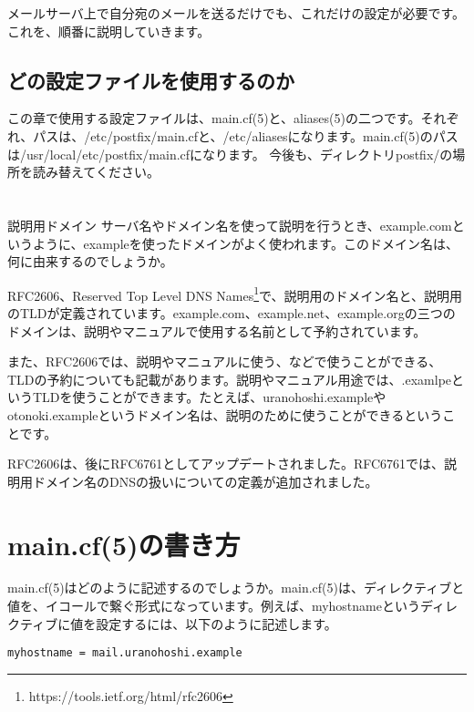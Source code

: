 メールサーバ上で自分宛のメールを送るだけでも、これだけの設定が必要です。これを、順番に説明していきます。



\subsection{どの設定ファイルを使用するのか}

この章で使用する設定ファイルは、main.cf(5)と、aliases(5)の二つです。それぞれ、パスは、/etc/postfix/main.cfと、/etc/aliasesになります。main.cf(5)のパスは/usr/local/etc/postfix/main.cfになります。
今後も、ディレクトリpostfix/の場所を読み替えてください。

\section*{}
\begin{itembox}[l]{説明用ドメイン}
サーバ名やドメイン名を使って説明を行うとき、example.comというように、exampleを使ったドメインがよく使われます。このドメイン名は、何に由来するのでしょうか。

RFC2606、Reserved Top Level DNS Names\footnote{https://tools.ietf.org/html/rfc2606}で、説明用のドメイン名と、説明用のTLDが定義されています。example.com、example.net、example.orgの三つのドメインは、説明やマニュアルで使用する名前として予約されています。

また、RFC2606では、説明やマニュアルに使う、などで使うことができる、TLDの予約についても記載があります。説明やマニュアル用途では、.examlpeというTLDを使うことができます。たとえば、uranohoshi.exampleやotonoki.exampleというドメイン名は、説明のために使うことができるということです。

RFC2606は、後にRFC6761としてアップデートされました。RFC6761では、説明用ドメイン名のDNSの扱いについての定義が追加されました。

\end{itembox}


\section{main.cf(5)の書き方}
main.cf(5)はどのように記述するのでしょうか。main.cf(5)は、ディレクティブと値を、イコールで繋ぐ形式になっています。例えば、myhostnameというディレクティブに値を設定するには、以下のように記述します。

\begin{lstlisting}[basicstyle=\ttfamily\footnotesize, frame=single]
myhostname = mail.uranohoshi.example
\end{lstlisting}

